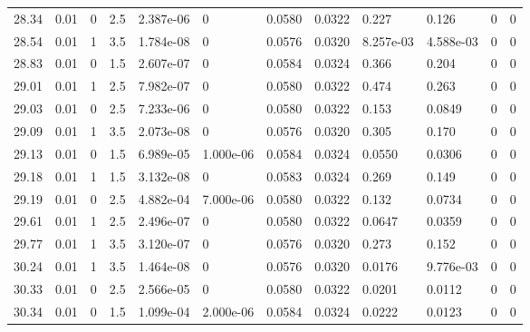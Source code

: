 \documentclass[preview]{standalone}
\begin{document}
{{{{{\begin{tabular}{L{1.2cm}C{1.2cm} C{0.3cm}C{0.5cm} C{1.4cm}C{1.4cm} C{1.4cm}C{1.4cm} C{1.6cm}C{1.6cm} C{1.6cm}C{1.6cm}}
  28.34  &  0.01  & 0     & 2.5 &  2.387e-06  & 0  &  0.0580&   0.0322& 0.227 & 0.126   &  0 & 0  \\ 
  28.54  &  0.01  & 1     & 3.5 &  1.784e-08  & 0  &  0.0576&   0.0320& 8.257e-03 & 4.588e-03   &  0 & 0  \\ 
  28.83  &  0.01  & 0     & 1.5 &  2.607e-07  & 0  &  0.0584&   0.0324& 0.366 & 0.204   &  0 & 0  \\ 
  29.01  &  0.01  & 1     & 2.5 &  7.982e-07  & 0  &  0.0580&   0.0322& 0.474 & 0.263   &  0 & 0  \\ 
  29.03  &  0.01  & 0     & 2.5 &  7.233e-06  & 0  &  0.0580&   0.0322& 0.153 & 0.0849   &  0 & 0  \\ 
  29.09  &  0.01  & 1     & 3.5 &  2.073e-08  & 0  &  0.0576&   0.0320& 0.305 & 0.170   &  0 & 0  \\ 
  29.13  &  0.01  & 0     & 1.5 &  6.989e-05  & 1.000e-06  &  0.0584&   0.0324& 0.0550 & 0.0306   &  0 & 0  \\ 
  29.18  &  0.01  & 1     & 1.5 &  3.132e-08  & 0  &  0.0583&   0.0324& 0.269 & 0.149   &  0 & 0  \\ 
  29.19  &  0.01  & 0     & 2.5 &  4.882e-04  & 7.000e-06  &  0.0580&   0.0322& 0.132 & 0.0734   &  0 & 0  \\ 
  29.61  &  0.01  & 1     & 2.5 &  2.496e-07  & 0  &  0.0580&   0.0322& 0.0647 & 0.0359   &  0 & 0  \\ 
  29.77  &  0.01  & 1     & 3.5 &  3.120e-07  & 0  &  0.0576&   0.0320& 0.273 & 0.152   &  0 & 0  \\ 
  30.24  &  0.01  & 1     & 3.5 &  1.464e-08  & 0  &  0.0576&   0.0320& 0.0176 & 9.776e-03   &  0 & 0  \\ 
  30.33  &  0.01  & 0     & 2.5 &  2.566e-05  & 0  &  0.0580&   0.0322& 0.0201 & 0.0112   &  0 & 0  \\ 
  30.34  &  0.01  & 0     & 1.5 &  1.099e-04  & 2.000e-06  &  0.0584&   0.0324& 0.0222 & 0.0123   &  0 & 0  \\ 
\hline 
\end{tabular} 

}}}}}
\end{document}
